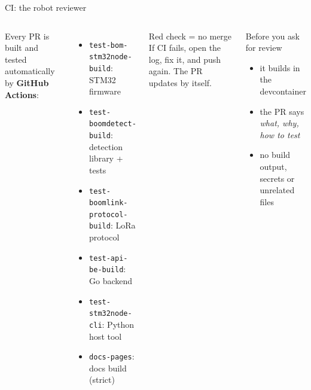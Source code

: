 \documentclass[aspectratio=169,10pt]{beamer}
\newcommand{\code}[1]{\texttt{#1}}
\begin{document}
\begin{frame}{CI: the robot reviewer}
  \begin{columns}[T,onlytextwidth]
      Every PR is built and tested automatically by \textbf{GitHub Actions}:\par\medskip
      \small
      \begin{itemize}
        \setlength{\itemsep}{2pt}
        \item \code{test-bom-stm32node-build}: STM32 firmware
        \item \code{test-boomdetect-build}: detection library + tests
        \item \code{test-boomlink-protocol-build}: LoRa protocol
        \item \code{test-api-be-build}: Go backend
        \item \code{test-stm32node-cli}: Python host tool
        \item \code{docs-pages}: docs build (strict)
      \end{itemize}
      \begin{alertblock}{Red check = no merge}
        \small
        If CI fails, open the log, fix it, and push again. The PR updates by itself.
      \end{alertblock}
      \vspace{4pt}
      \begin{block}{Before you ask for review}
        \small
        \begin{itemize}
          \item it builds in the devcontainer
          \item the PR says \emph{what, why, how to test}
          \item no build output, secrets or unrelated files
        \end{itemize}
      \end{block}
  \end{columns}
\end{frame}
\end{document}
